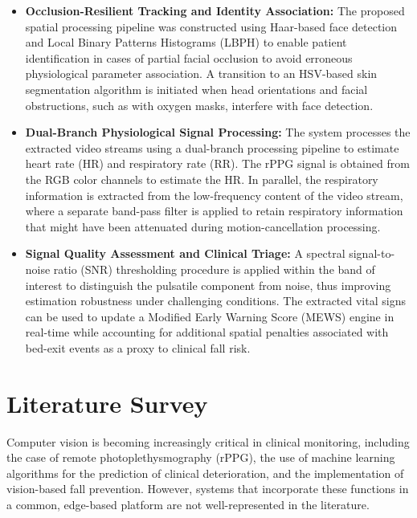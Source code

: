\documentclass[conference]{IEEEtran}
\begin{document}
\begin{itemize}
    \item \textbf{Occlusion-Resilient Tracking and Identity Association:} The proposed spatial processing pipeline was constructed using Haar-based face detection and Local Binary Patterns Histograms (LBPH) to enable patient identification in cases of partial facial occlusion to avoid erroneous physiological parameter association. A transition to an HSV-based skin segmentation algorithm is initiated when head orientations and facial obstructions, such as with oxygen masks, interfere with face detection.
    
    \item \textbf{Dual-Branch Physiological Signal Processing:} The system processes the extracted video streams using a dual-branch processing pipeline to estimate heart rate (HR) and respiratory rate (RR). The rPPG signal is obtained from the RGB color channels to estimate the HR. In parallel, the respiratory information is extracted from the low-frequency content of the video stream, where a separate band-pass filter is applied to retain respiratory information that might have been attenuated during motion-cancellation processing.
    
    \item \textbf{Signal Quality Assessment and Clinical Triage:} A spectral signal-to-noise ratio (SNR) thresholding procedure is applied within the band of interest to distinguish the pulsatile component from noise, thus improving estimation robustness under challenging conditions. The extracted vital signs can be used to update a Modified Early Warning Score (MEWS) engine in real-time while accounting for additional spatial penalties associated with bed-exit events as a proxy to clinical fall risk.
\end{itemize}

\section{Literature Survey}
Computer vision is becoming increasingly critical in clinical monitoring, including the case of remote photoplethysmography (rPPG), the use of machine learning algorithms for the prediction of clinical deterioration, and the implementation of vision-based fall prevention. However, systems that incorporate these functions in a common, edge-based platform are not well-represented in the literature.
\end{document}
